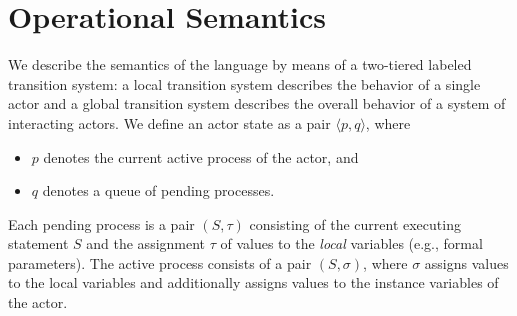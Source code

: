 \section{Operational Semantics} \label{ch02:sec:sos}
We describe the semantics of the language by means of a two-tiered labeled transition system:
a local transition system describes the behavior of a single actor and a global transition system
describes the overall behavior of a system of interacting actors.
We define an actor state as a pair $\langle p,q \rangle$, where
\begin{itemize}
 \item $p$ denotes the current active process of the actor, and
 \item $q$ denotes a queue of pending processes.
\end{itemize}
Each pending process is a pair  $(S, \tau)$ consisting of the current executing statement $S$ and the assignment $\tau$ of 
values  to the  \emph{local} variables (e.g., formal parameters).
The active process consists of a  pair  $(S,\sigma)$, where $\sigma$ assigns values to the local variables
and additionally assigns values to the instance variables
of the actor.




% 

